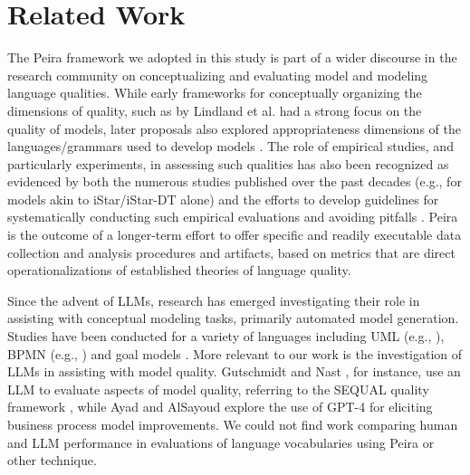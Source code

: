 \section{Related Work}\label{sec:related}

The Peira framework we adopted in this study is part of a wider discourse in the research community on conceptualizing and evaluating model and modeling language qualities. While early frameworks for conceptually organizing the dimensions of quality, such as by Lindland et al. \cite{LiSS.94} had a strong focus on the quality of models, later proposals also explored appropriateness dimensions of the languages/grammars used to develop models \cite{Krog.12,NePG.12,Mood.09,WaWe.93,Guiz.05}. The role of empirical studies, and particularly experiments, in assessing such qualities has also been recognized as evidenced by both the numerous studies published over the past decades (e.g., \cite{CGHM.13,LiHJ.13,HBKPRS.13,AlZL.17,LiRZ.17,LiTa.19} for models akin to iStar/iStar-DT alone) and the efforts to develop guidelines for systematically conducting such empirical evaluations and avoiding pitfalls \cite{BuWW.09,PaCo.05,KGPP.02,Mood.05,HoFL.12}. Peira is the outcome of a longer-term effort \cite{LiJa.20,LiMK.21b} to offer specific and readily executable data collection and analysis procedures and artifacts, based on metrics that are direct operationalizations of established theories of language quality.  

Since the advent of LLMs, research has emerged investigating their role in assisting with conceptual modeling tasks, primarily automated model generation. Studies have been conducted for a variety of languages including UML (e.g., \cite{CTBV.23,DGCT+24,FeAA.24,XiSB.25}), BPMN (e.g., \cite{HoMR.26,LPRM.25,NAAD+25,WWLL+24}) and goal models \cite{CCHY+23}. More relevant to our work is the investigation of LLMs in assisting with model quality. Gutschmidt and Nast \cite{GuNa.25}, for instance, use an LLM to evaluate aspects of model quality, referring to the SEQUAL quality framework \cite{Krog.12}, while Ayad and AlSayoud \cite{AyAl.24} explore the use of GPT-4 for eliciting business process model improvements. We could not find work comparing human and LLM performance in evaluations of language vocabularies using Peira or other technique.
